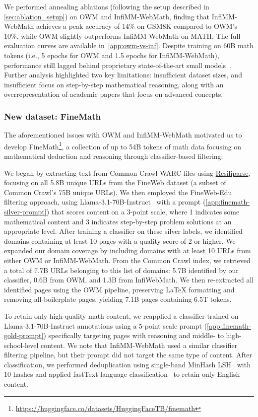 \documentclass{article}
\theoremstyle{plain}
\theoremstyle{definition}
\theoremstyle{remark}
\begin{document}
We performed annealing ablations (following the setup described in \cref{sec:ablation_setup}) on OWM and InfiMM-WebMath, finding that InfiMM-WebMath achieves a peak accuracy of 14\% on GSM8K compared to OWM’s 10\%, while OWM slightly outperforms InfiMM-WebMath on MATH. The full evaluation curves are available in~\cref{app:owm-vs-inf}. Despite training on 60B math tokens (i.e., 5 epochs for OWM and 1.5 epochs for InfiMM-WebMath), performance still lagged behind proprietary state-of-the-art small models~\cite{Yang2024Qwen2TR}. Further analysis highlighted two key limitations: insufficient dataset sizes, and insufficient focus on step-by-step mathematical reasoning, along with an overrepresentation of academic papers that focus on advanced concepts.

\subsubsection{New dataset: FineMath}

The aforementioned issues with OWM and InfiMM-WebMath motivated us to develop FineMath\footnote{\href{https://huggingface.co/datasets/HuggingFaceTB/finemath}{https://huggingface.co/datasets/HuggingFaceTB/finemath}}, a collection of up to 54B tokens of math data focusing on mathematical deduction and reasoning through classifier-based filtering.

We began by extracting text from Common Crawl WARC files using \href{https://resiliparse.chatnoir.eu/}{Resiliparse}, focusing on all 5.8B unique URLs from the FineWeb dataset (a subset of Common Crawl's 75B unique URLs).
We then employed the FineWeb-Edu filtering approach, using Llama-3.1-70B-Instruct~\citep{dubey2024llama} with a prompt (\cref{app:finemath-silver-prompt}) that scores content on a 3-point scale, where 1 indicates some mathematical content and 3 indicates step-by-step problem solutions at an appropriate level.
After training a classifier on these silver labels, we identified domains containing at least 10 pages with a quality score of 2 or higher.
We expanded our domain coverage by including domains with at least 10 URLs from either OWM or InfiMM-WebMath. From the Common Crawl index, we retrieved a total of 7.7B URLs belonging to this list of domains: 5.7B identified by our classifier, 0.6B from OWM, and 1.3B from InfiWebMath. 
We then re-extracted all identified pages using the OWM pipeline, preserving LaTeX formatting and removing all-boilerplate pages, yielding 7.1B pages containing 6.5T tokens.

To retain only high-quality math content, we reapplied a classifier trained on Llama-3.1-70B-Instruct annotations using a 5-point scale prompt (\cref{app:finemath-gold-prompt}) specifically targeting pages with reasoning and middle- to high-school-level content.
We note that InfiMM-WebMath used a similar classifier filtering pipeline, but their prompt did not target the same type of content.
After classification, we performed deduplication using single-band MinHash LSH~\cite{Broder1997MinHash} with 10 hashes and applied fastText language classification~\cite{joulin2016fasttext,joulin2016bag} to retain only English content.
\end{document}

